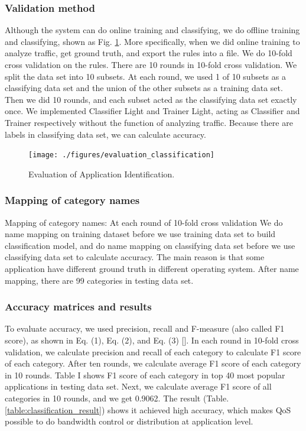 \documentclass[journal]{IEEEtran}
\begin{document}
\subsubsection{Validation method}
Although the system can do online training and classifying, we do offline training and classifying, shown as Fig. \ref{fig:evaluation_classification}. More specifically, when we did online training to analyze traffic, get ground truth, and export the rules into a file. We do 10-fold cross validation on the rules. There are 10 rounds in 10-fold cross validation. We split the data set into 10 subsets. At each round, we used 1 of 10 subsets as a classifying data set and the union of the other subsets as a training data set. Then we did 10 rounds, and each subset acted as the classifying data set exactly once. We implemented Classifier Light and Trainer Light, acting as Classifier and Trainer respectively without the function of analyzing traffic. Because there are labels in classifying data set, we can calculate accuracy.

\begin{figure}[!t]
\centering
\texttt{[image: ./figures/evaluation\_classification]}
\caption{Evaluation of Application Identification.}
\label{fig:evaluation_classification}
\end{figure}

\subsubsection{Mapping of category names}
Mapping of category names: At each round of 10-fold cross validation We do name mapping on training dataset before we use training data set to build classification model, and do name mapping on classifying data set before we use classifying data set to calculate accuracy. The main reason is that some application have different ground truth in different operating system. After name mapping, there are 99 categories in testing data set.

\subsubsection{Accuracy matrices and results}
To evaluate accuracy, we used precision, recall and F-measure (also called F1 score), as shown in Eq. (1), Eq. (2), and Eq. (3) []. In each round in 10-fold cross validation, we calculate precision and recall of each category to calculate F1 score of each category. After ten rounds, we calculate average F1 score of each category in 10 rounds. Table I shows F1 score of each category in top 40 most popular applications in testing data set. Next, we calculate average F1 score of all categories in 10 rounds, and we get 0.9062. The result (Table. \ref{table:classification_result}) shows it achieved high accuracy, which makes QoS possible to do bandwidth control or distribution at application level.
\end{document}
